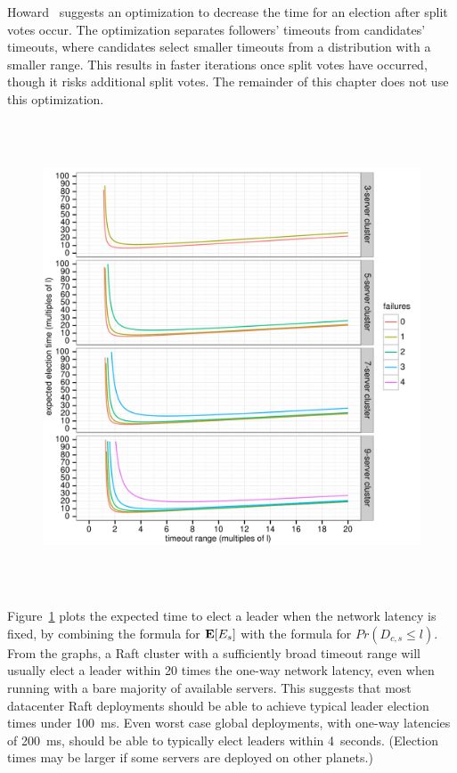 Howard~\cite{Howard:2014} suggests an optimization to decrease the time
for an election after split votes occur. The optimization separates
followers' timeouts from candidates' timeouts, where candidates select
smaller timeouts from a distribution with a smaller range. This results
in faster iterations once split votes have occurred, though it risks
additional split votes. The remainder of this chapter does not use this
optimization.

\begin{figure}
\centering
\includegraphics[height=5.5in]{leaderelection/overall}
\hspace{-2em}
\label{fig:leaderelection:theory:overall}
\end{figure}

Figure~\ref{fig:leaderelection:theory:overall} plots the expected time to
elect a leader when the network latency is fixed, by combining the
formula for $\mathop{\bf E\/}[E_s]$ with the formula for $Pr(D_{c,s} \leq l)$.
From the graphs, a Raft cluster with a sufficiently broad timeout range
will usually elect a leader within 20 times the one-way network latency,
even when running with a bare majority of available servers. This
suggests that most datacenter Raft deployments should be able to achieve
typical leader election times under \SI{100}{\milli\second}. Even worst
case global deployments, with one-way latencies of
\SI{200}{\milli\second},
should be able to typically elect leaders within \SI{4}{seconds}. (Election
times may be larger if some servers are deployed on other planets.)

